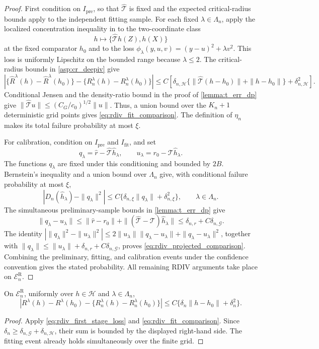 \begin{proof}
First condition on $I_{\mathrm{pre}}$, so that $\hat{\mathcal T}$ is fixed and the expected critical-radius bounds apply to the independent fitting sample. For each fixed $\lambda\in\Lambda_n$, apply the localized concentration inequality in \citet[Lemma~14]{foster2023orthogonal} to the two-coordinate class
\[
h\longmapsto\{\hat{\mathcal T}h(Z),h(X)\}
\]
at the fixed comparator $h_0$ and to the loss
$\phi_\lambda(y,u,v)=(y-u)^2+\lambda v^2$. This loss is uniformly Lipschitz on the bounded range because $\lambda\leqslant2$. The critical-radius bounds in \cref{asp:cr_deepiv} give
\[
\left|\{\widehat R^\lambda(h)-\widehat R^\lambda(h_0)\}
-\{R_n^\lambda(h)-R_n^\lambda(h_0)\}\right|
\leqslant C\left[\delta_{n,\mathcal H}
\{\|\hat{\mathcal T}(h-h_0)\|+\|h-h_0\|\}
+\delta_{n,\mathcal H}^2\right].
\]
Conditional Jensen and the density-ratio bound in the proof of \cref{lemma:t_err_dp} give
$\|\hat{\mathcal T}u\|\leqslant(C_G/c_0)^{1/2}\|u\|$.
Thus, a union bound over the $K_n+1$ deterministic grid points gives \eqref{eq:rdiv_fit_comparison}. The definition of $\eta_n$ makes its total failure probability at most $\xi$.

For calibration, condition on $I_{\mathrm{pre}}$ and $I_{\mathrm{fit}}$, and set
\[
q_\lambda=\hat r-\hat{\mathcal T}\hat h_\lambda, \qquad u_\lambda=r_0-\mathcal T\hat h_\lambda.
\]
The functions $q_\lambda$ are fixed under this conditioning and bounded by $2B$. Bernstein's inequality and a union bound over $\Lambda_n$ give, with conditional failure probability at most $\xi$,
\[
|D_n(\hat h_\lambda)-\|q_\lambda\|^2|
\leqslant C\{\delta_{n,\xi}\|q_\lambda\|+\delta_{n,\xi}^2\},
\qquad \lambda\in\Lambda_n.
\]
The simultaneous preliminary-sample bounds in \cref{lemma:t_err_dp} give
\[
\|q_\lambda-u_\lambda\|
\leqslant\|\hat r-r_0\|
+\|(\hat{\mathcal T}-\mathcal T)\hat h_\lambda\|
\leqslant \delta_{n,r}+C\delta_{n,\mathcal G}.
\]
The identity $|\|q_\lambda\|^2-\|u_\lambda\|^2|\leqslant
2\|u_\lambda\|\|q_\lambda-u_\lambda\|+\|q_\lambda-u_\lambda\|^2$, together with
$\|q_\lambda\|\leqslant\|u_\lambda\|+\delta_{n,r}+C\delta_{n,\mathcal G}$, proves \eqref{eq:rdiv_projected_comparison}. Combining the preliminary, fitting, and calibration events under the confidence convention gives the stated probability. All remaining RDIV arguments take place on $\mathcal E_n^{\mathrm R}$.
\end{proof}

\begin{lemma}\label{lemma:err_r_dp}
On $\mathcal E_n^{\mathrm R}$, uniformly over $h\in\mathcal H$ and $\lambda\in\Lambda_n$,
\[
\left|
R^\lambda(h)-R^\lambda(h_0)
-\{R_n^\lambda(h)-R_n^\lambda(h_0)\}
\right|
\leqslant C\{\delta_n\|h-h_0\|+\delta_n^2\}.
\]
\end{lemma}
\begin{proof}
Apply \eqref{eq:rdiv_first_stage_loss} and \eqref{eq:rdiv_fit_comparison}. Since
$\delta_n\geqslant\delta_{n,\mathcal G}+\delta_{n,\mathcal H}$, their sum is bounded by the displayed right-hand side. The fitting event already holds simultaneously over the finite grid.
\end{proof}

